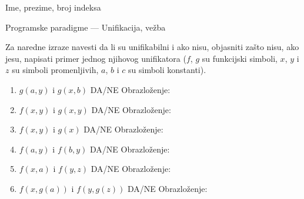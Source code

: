 \documentclass[a4paper]{article}
\date{}
\begin{document}
\noindent Ime, prezime, broj indeksa \hrulefill \\

\begin{center}
{Programske paradigme --- Unifikacija, vežba}
\end{center}


Za naredne izraze navesti da li su unifikabilni i ako nisu, objasniti zašto nisu, ako jesu, napisati primer jednog njihovog unifikatora ($f$, $g$ su funkcijski simboli, $x$, $y$ i $z$ su simboli promenljivih, $a$, $b$ i $c$ su simboli konstanti).\\
\vspace*{1mm}

\begin{enumerate}
\item $g(a, y)$ i $g(x, b)$ \hspace*{17mm} DA/NE \hspace*{3mm}  Obrazloženje: \vspace*{10mm}\\

\item $f(x, y)$ i $g(x, y)$ \hspace*{17mm} DA/NE \hspace*{3mm}  Obrazloženje: \vspace*{10mm}\\

\item $f(x, y)$ i $g(x)$ \hspace*{17mm} DA/NE \hspace*{3mm}  Obrazloženje: \vspace*{10mm}\\

\item $f(a, y)$ i $f(b, y)$ \hspace*{17mm} DA/NE \hspace*{3mm}  Obrazloženje: \vspace*{10mm}\\

\item $f(x, a)$ i $f(y, z)$ \hspace*{17mm} DA/NE \hspace*{3mm}  Obrazloženje: \vspace*{10mm}\\

\item $f(x, g(a))$ i $f(y, g(z))$ \hspace*{7mm} DA/NE \hspace*{3mm}  Obrazloženje: \vspace*{10mm} \\


\end{enumerate}
\end{document}
